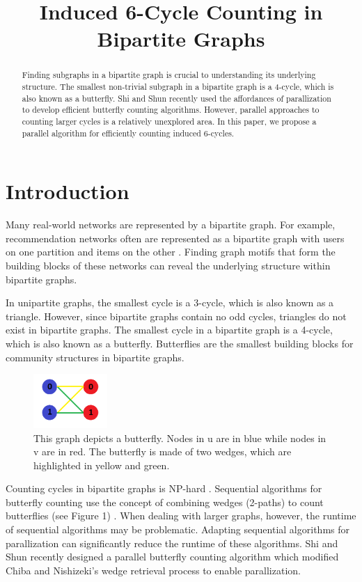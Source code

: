 \documentclass[11pt]{article}
\title{Induced 6-Cycle Counting in Bipartite Graphs}
\begin{document}
\maketitle

\begin{abstract}
Finding subgraphs in a bipartite graph is crucial to understanding its underlying structure.
The smallest non-trivial subgraph in a bipartite graph is a 4-cycle, which is also known as a butterfly.
Shi and Shun recently used the affordances of parallization to develop efficient butterfly counting algorithms.
However, parallel approaches to counting larger cycles is a relatively unexplored area.
In this paper, we propose a parallel algorithm for efficiently counting induced 6-cycles.
\end{abstract}

\section{Introduction}
Many real-world networks are represented by a bipartite graph.
For example, recommendation networks often are represented as a bipartite graph with users on one partition and items on the other \cite{li2013recommendation}.
Finding graph motifs that form the building blocks of these networks can reveal the underlying structure within bipartite graphs.

In unipartite graphs, the smallest cycle is a 3-cycle, which is also known as a triangle.
However, since bipartite graphs contain no odd cycles, triangles do not exist in bipartite graphs.
The smallest cycle in a bipartite graph is a 4-cycle, which is also known as a butterfly.
Butterflies are the smallest building blocks for community structures in bipartite graphs.

\begin{figure}[h]
    \centering
    \includegraphics[width=0.25\textwidth]{figures/Butterfly.png}
    \caption{\small This graph depicts a butterfly. Nodes in u are in blue while nodes in v are in red. The butterfly is made of two wedges, which are highlighted in yellow and green.}
    \label{fig:butterfly}
\end{figure}

Counting cycles in bipartite graphs is NP-hard \cite{flum2004parameterized}.
Sequential algorithms for butterfly counting use the concept of combining wedges (2-paths) to count butterflies (see Figure 1) \cite{wang2014rectangle, sanei2018butterfly, chiba1985arboricity}.
When dealing with larger graphs, however, the runtime of sequential algorithms may be problematic.
Adapting sequential algorithms for parallization can significantly reduce the runtime of these algorithms.
Shi and Shun \cite{shi2019parallel} recently designed a parallel butterfly counting algorithm which modified Chiba and Nishizeki's wedge retrieval process \cite{chiba1985arboricity} to enable parallization.
\end{document}

